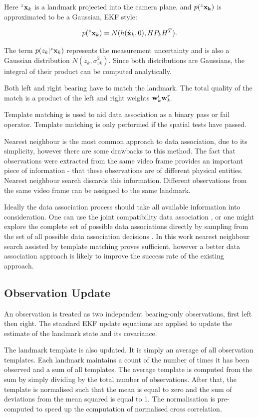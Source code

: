 Here $^z{\bf x}_k$ is a landmark projected into the camera plane, and
$p(^z{\bf x_k})$ is approximated to be a Gaussian, EKF style:

$$
p(^z{\bf x}_k) = N(h(\hat{\bf x}_k,0), H P_k H^T).
$$

The term $p(z_k|^z{\bf x}_k)$ represents the measurement uncertainty
and is also a Gaussian distribution $N(z_k ,\sigma^2_{vk})$. Since
both distributions are Gaussians, the integral of their product can be
computed analytically.

Both left and right bearing have to match the landmark. The total
quality of the match is a product of the left and right weights ${\bf
  w}^l_k{\bf w}^r _k$.

Template matching is used to aid data association as a binary pass or
fail operator. Template matching is only performed if the spatial
tests have passed.

Nearest neighbour is the most common approach to data association, due
to its simplicity, however there are some drawbacks to this
method. The fact that observations were extracted from the same video
frame provides an important piece of information - that these
observations are of different physical entities. Nearest neighbour
search discards this information. Different observations from the same
video frame can be assigned to the same landmark.

Ideally the data association process should take all available
information into consideration. One can use the joint compatibility
data association \cite{neira01:_data_assoc_stoch_mappin_using}, or one
might explore the complete set of possible data associations directly
by sampling from the set of all possible data association decisions
\cite{nieto2003}. In this work nearest neighbour search assisted by
template matching proves sufficient, however a better data association
approach is likely to improve the success rate of the existing
approach.


\subsection{Observation Update}

An observation is treated as two independent bearing-only
observations, first left then right. The standard EKF update equations
are applied to update the estimate of the landmark state and its
covariance.

The landmark template is also updated. It is simply an average of all
observation templates. Each landmark maintains a count of the number
of times it has been observed and a sum of all templates. The average
template is computed from the sum by simply dividing by the total
number of observations. After that, the template is normalised such
that the mean is equal to zero and the sum of deviations from the
mean squared is equal to 1. The normalisation is pre-computed to speed up
the computation of normalised cross correlation.


